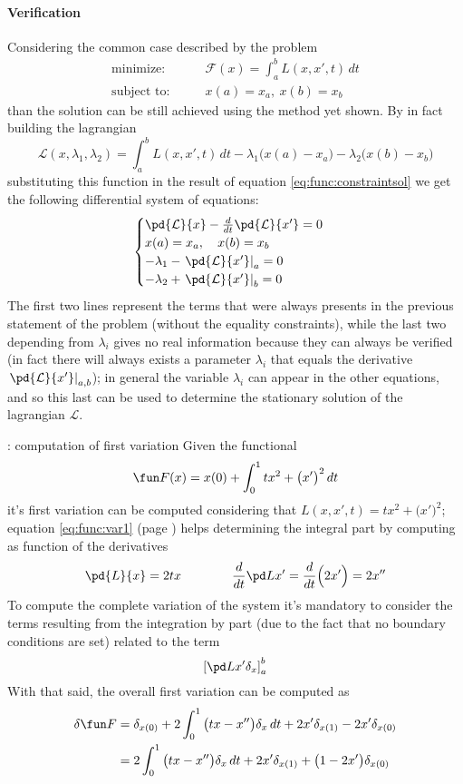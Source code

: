 \paragraph{Verification} Considering the common case described by the problem
\begin{align*} 
	\textrm{minimize:}& \qquad \mathcal F(x) = \int_a^b L (x,x',t)\, dt \\
	\textrm{subject to:}& \qquad x(a) = x_a, \ x(b) = x_b
\end{align*}
than the solution can be still achieved using the method yet shown. By in fact building the lagrangian 
\[ \mathcal L   (x,\lambda_1,\lambda_2) = \int_a^b L (x,x',t)\, dt - \lambda_1\big(x(a)-x_a\big) -\lambda_2 \big(x(b) - x_b \big) \]
substituting this function in the result of equation \ref{eq:func:constraintsol} we get the following differential system of equations:
\[ \begin{cases}
	\pd{\mathcal L  }{x} - \frac d {dt}\pd{\mathcal L  }{x'} = 0 \\
	x(a) = x_a, \quad x(b) = x_b\\ 
	-\lambda_1 - \left. \pd{\mathcal L  }{x'} \right|_a = 0 \\
	-\lambda_2 + \left. \pd{\mathcal L  }{x'} \right|_b = 0 \\
\end{cases} \]
The first two lines represent the terms that were always presents in the previous statement of the problem (without the equality constraints), while the last two depending from $\lambda_i$ gives no real information because they can always be verified (in fact there will always exists a parameter $\lambda_i$  that equals the derivative $\left. \pd{\mathcal L  }{x'}\right|_{a,b}$); in general the variable $\lambda_i$ can appear in the other equations, and so this last can be used to determine the stationary solution of the lagrangian $\mathcal L  $.


\begin{example}{: computation of first variation}
	Given the functional
	\[ \fun F(x) = x(0) + \int_0^1 tx^2 + \big(x'\big)^2\, dt \]
	it's first variation can be computed considering that $L(x,x',t) = tx^2 + \big(x'\big)^2$;  equation \ref{eq:func:var1} (page \pageref{eq:func:var1}) helps determining the integral part by computing as function of the derivatives
	\[ \pd{L}{x} = 2tx  \qquad \qquad \frac d{dt}\pd L{x'} = \frac d{dt}\Big( 2x' \Big) = 2x''  \]
	To compute the complete variation of the system it's mandatory to consider the terms resulting from the integration by part (due to the fact that no boundary conditions are set) related to the term
	\[ \left[ \pd L {x'} \delta_x \right]_a^b \]
	With that said, the overall first variation can be computed as
	\begin{align*}
		\delta \fun F & = \delta_{x(0)} + 2\int_0^1 \big(tx-x''\big) \delta_x\, dt + 2x' \delta_{x(1)} - 2x' \delta_{x(0)} \\ & = 2\int_0^1 \big(tx-x''\big) \delta_x\, dt + 2x' \delta_{x(1)} + \big( 1 - 2x' \big) \delta_{x(0)}
	\end{align*}
\end{example}

